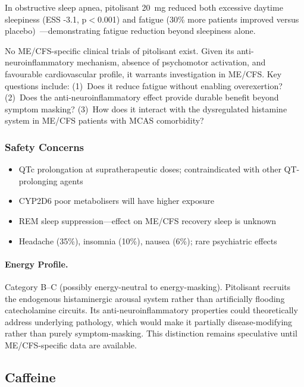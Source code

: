 In obstructive sleep apnea, pitolisant 20~mg reduced both excessive daytime sleepiness (ESS -3.1, p$<$0.001) and fatigue (30\% more patients improved versus placebo)~\cite{Oertel2021pitolisantOSA}---demonstrating fatigue reduction beyond sleepiness alone.

\begin{open_question}
No ME/CFS-specific clinical trials of pitolisant exist. Given its anti-neuroinflammatory mechanism, absence of psychomotor activation, and favourable cardiovascular profile, it warrants investigation in ME/CFS. Key questions include: (1)~Does it reduce fatigue without enabling overexertion? (2)~Does the anti-neuroinflammatory effect provide durable benefit beyond symptom masking? (3)~How does it interact with the dysregulated histamine system in ME/CFS patients with MCAS comorbidity?
\end{open_question}

\subsubsection{Safety Concerns}

\begin{itemize}
    \item QTc prolongation at supratherapeutic doses; contraindicated with other QT-prolonging agents
    \item CYP2D6 poor metabolisers will have higher exposure
    \item REM sleep suppression---effect on ME/CFS recovery sleep is unknown
    \item Headache (35\%), insomnia (10\%), nausea (6\%); rare psychiatric effects
\end{itemize}

\paragraph{Energy Profile.}
Category B--C (possibly energy-neutral to energy-masking). Pitolisant recruits the endogenous histaminergic arousal system rather than artificially flooding catecholamine circuits. Its anti-neuroinflammatory properties could theoretically address underlying pathology, which would make it partially disease-modifying rather than purely symptom-masking. This distinction remains speculative until ME/CFS-specific data are available.

\subsection{Caffeine}
\label{subsec:caffeine}

